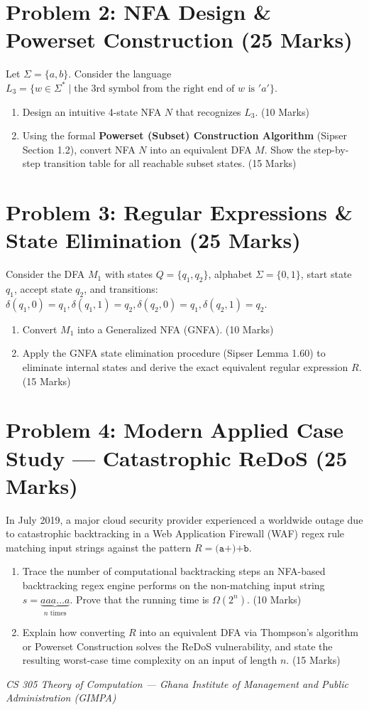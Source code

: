 \documentclass[11pt,a4paper]{article}
\begin{document}
\vspace{8pt}

\section*{Problem 2: NFA Design \& Powerset Construction (25 Marks)}
Let $\Sigma = \{a, b\}$. Consider the language $L_3 = \{w \in \Sigma^* \mid \text{the 3rd symbol from the right end of } w \text{ is } 'a'\}$.
\begin{enumerate}[label=\textbf{(\alph*)}]
    \item Design an intuitive 4-state NFA $N$ that recognizes $L_3$. (10 Marks)
    \item Using the formal \textbf{Powerset (Subset) Construction Algorithm} (Sipser Section 1.2), convert NFA $N$ into an equivalent DFA $M$. Show the step-by-step transition table for all reachable subset states. (15 Marks)
\end{enumerate}

\vspace{8pt}

\section*{Problem 3: Regular Expressions \& State Elimination (25 Marks)}
Consider the DFA $M_1$ with states $Q=\{q_1, q_2\}$, alphabet $\Sigma=\{0, 1\}$, start state $q_1$, accept state $q_2$, and transitions:
$\delta(q_1, 0) = q_1, \delta(q_1, 1) = q_2, \delta(q_2, 0) = q_1, \delta(q_2, 1) = q_2$.
\begin{enumerate}[label=\textbf{(\alph*)}]
    \item Convert $M_1$ into a Generalized NFA (GNFA). (10 Marks)
    \item Apply the GNFA state elimination procedure (Sipser Lemma 1.60) to eliminate internal states and derive the exact equivalent regular expression $R$. (15 Marks)
\end{enumerate}

\vspace{8pt}

\section*{Problem 4: Modern Applied Case Study --- Catastrophic ReDoS (25 Marks)}
In July 2019, a major cloud security provider experienced a worldwide outage due to catastrophic backtracking in a Web Application Firewall (WAF) regex rule matching input strings against the pattern $R = \texttt{(a+)+b}$.
\begin{enumerate}[label=\textbf{(\alph*)}]
    \item Trace the number of computational backtracking steps an NFA-based backtracking regex engine performs on the non-matching input string $s = \underbrace{a a a \dots a}_{n \text{ times}}$. Prove that the running time is $\Omega(2^n)$. (10 Marks)
    \item Explain how converting $R$ into an equivalent DFA via Thompson's algorithm or Powerset Construction solves the ReDoS vulnerability, and state the resulting worst-case time complexity on an input of length $n$. (15 Marks)
\end{enumerate}

\vfill
\begin{center}
    \small\color{darkgray}
    \textit{CS 305 Theory of Computation --- Ghana Institute of Management and Public Administration (GIMPA)}
\end{center}
\end{document}
